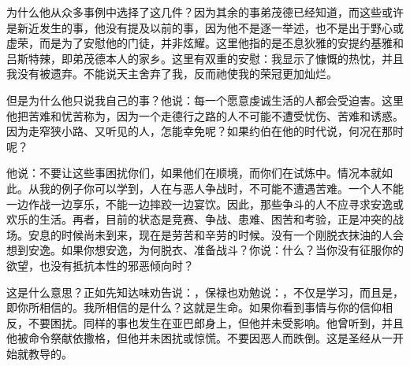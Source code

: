 为什么他从众多事例中选择了这几件？因为其余的事弟茂德已经知道，而这些或许是新近发生的事，他没有提及以前的事，因为他不是逐一举述，也不是出于野心或虚荣，而是为了安慰他的门徒，并非炫耀。这里他指的是丕息狄雅的安提约基雅和吕斯特辣，即弟茂德本人的家乡。这里有双重的安慰：我显示了慷慨的热忱，并且我没有被遗弃。不能说天主舍弃了我，反而祂使我的荣冠更加灿烂。\par

\par

\par

但是为什么他只说我自己的事？他说：每一个愿意虔诚生活的人都会受迫害。这里他把苦难和忧苦称为，因为一个走德行之路的人不可能不遭受忧伤、苦难和诱惑。因为走窄狭小路、又听见的人，怎能幸免呢？如果约伯在他的时代说，何况在那时呢？\par

\par

他说：不要让这些事困扰你们，如果他们在顺境，而你们在试炼中。情况本就如此。从我的例子你可以学到，人在与恶人争战时，不可能不遭遇苦难。一个人不能一边作战一边享乐，不能一边摔跤一边宴饮。因此，那些争斗的人不应寻求安逸或欢乐的生活。再者，目前的状态是竞赛、争战、患难、困苦和考验，正是冲突的战场。安息的时候尚未到来，现在是劳苦和辛劳的时候。没有一个刚脱衣抹油的人会想到安逸。如果你想安逸，为何脱衣、准备战斗？你说：什么？当你没有征服你的欲望，也没有抵抗本性的邪恶倾向时？\par

 \par

这是什么意思？正如先知达味劝告说：，保禄也劝勉说：，不仅是学习，而且是，即你所相信的。我所相信的是什么？这就是生命。如果你看到事情与你的信仰相反，不要困扰。同样的事也发生在亚巴郎身上，但他并未受影响。他曾听到，并且他被命令祭献依撒格，但他并未困扰或惊慌。不要因恶人而跌倒。这是圣经从一开始就教导的。\par

